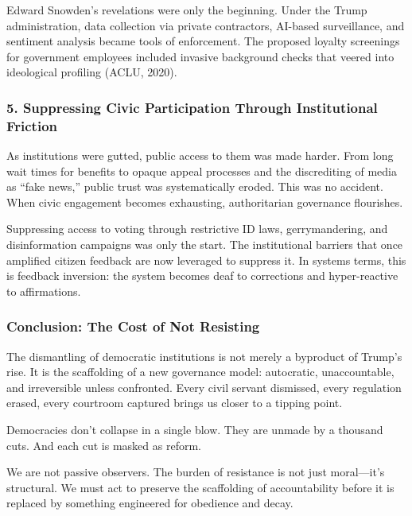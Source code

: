 \documentclass[
]{article}
\begin{document}
Edward Snowden's revelations were only the beginning. Under the Trump administration, data collection via private contractors, AI-based surveillance, and sentiment analysis became tools of enforcement. The proposed loyalty screenings for government employees included invasive background checks that veered into ideological profiling (ACLU, 2020).

\subsubsection{\texorpdfstring{5. \textbf{Suppressing Civic Participation Through Institutional Friction}}{5. Suppressing Civic Participation Through Institutional Friction}}\label{suppressing-civic-participation-through-institutional-friction}

As institutions were gutted, public access to them was made harder. From long wait times for benefits to opaque appeal processes and the discrediting of media as ``fake news,'' public trust was systematically eroded. This was no accident. When civic engagement becomes exhausting, authoritarian governance flourishes.

Suppressing access to voting through restrictive ID laws, gerrymandering, and disinformation campaigns was only the start. The institutional barriers that once amplified citizen feedback are now leveraged to suppress it. In systems terms, this is feedback inversion: the system becomes deaf to corrections and hyper-reactive to affirmations.

\subsubsection{Conclusion: The Cost of Not Resisting}\label{conclusion-the-cost-of-not-resisting}

The dismantling of democratic institutions is not merely a byproduct of Trump's rise. It is the scaffolding of a new governance model: autocratic, unaccountable, and irreversible unless confronted. Every civil servant dismissed, every regulation erased, every courtroom captured brings us closer to a tipping point.

Democracies don't collapse in a single blow. They are unmade by a thousand cuts. And each cut is masked as reform.

We are not passive observers. The burden of resistance is not just moral---it's structural. We must act to preserve the scaffolding of accountability before it is replaced by something engineered for obedience and decay.
\end{document}
